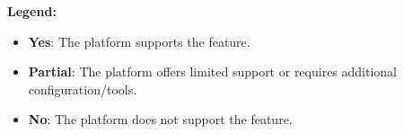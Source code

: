 \textbf{Legend:}

\begin{itemize}
\tightlist
\item
  \textbf{Yes}: The platform supports the feature.
\item
  \textbf{Partial}: The platform offers limited support or requires
  additional configuration/tools.
\item
  \textbf{No}: The platform does not support the feature.
\end{itemize}



